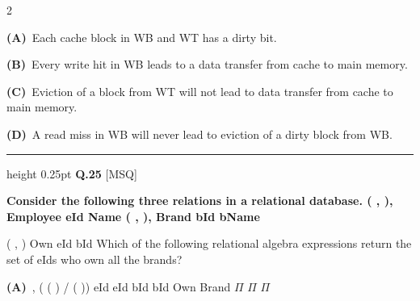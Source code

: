 \documentclass[a4paper,10pt,twoside]{article}
\begin{document}
\begin{multicols}{2}
\par\vspace{2pt}\noindent
\textbf{(A)}~Each cache block in WB and WT has a dirty bit.\par\vspace{2pt}\noindent
\textbf{(B)}~Every write hit in WB leads to a data transfer from cache to main memory.\par\vspace{2pt}\noindent
\textbf{(C)}~Eviction of a block from WT will not lead to data transfer from cache to main \newline memory.\par\vspace{2pt}\noindent
\textbf{(D)}~A read miss in WB will never lead to eviction of a dirty block from WB.
\par\vspace{6pt}\hrule height 0.25pt\vspace{6pt}
\noindent\textbf{Q.25} \hfill {\footnotesize\textsf{[MSQ]}}
\par\vspace{2pt}
{\bfseries Consider the following three relations in a relational database.
(
,
),
Employee eId Name
(
,
),
Brand bId bName
\par\smallskip
(
,
)
Own eId bId
Which of the following relational algebra expressions return the set of eIds
who own all the brands? \par}
\par\vspace{2pt}\noindent
\textbf{(A)}~, \newline ( \newline ( \newline ) / \newline ( \newline )) \newline eId \newline eId bId \newline bId \newline Own \newline Brand \newline $\Pi$ \newline $\Pi$ \newline $\Pi$\par\vspace{2pt}\noindent

\end{multicols}
\end{document}
